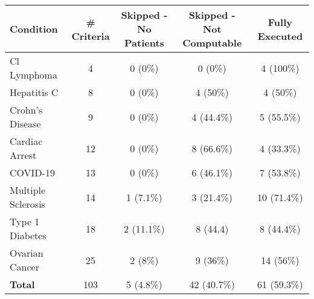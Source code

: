 \def\arraystretch{1.4}
\begin{tabular}{l c c c c}
    \textbf{Condition} & \textbf{\# Criteria} & \textbf{Skipped - \newline No Patients} & \textbf{Skipped - \newline Not Computable} & \textbf{Fully Executed} \\
    \toprule
    Cl Lymphoma        & 4  & 0 (0\%)    & 0 (0\%)    & 4  (100\%)  \\
    Hepatitis C        & 8  & 0 (0\%)    & 4 (50\%)   & 4  (50\%)   \\
    Crohn's Disease    & 9  & 0 (0\%)    & 4 (44.4\%) & 5  (55.5\%) \\
    Cardiac Arrest     & 12 & 0 (0\%)    & 8 (66.6\%) & 4  (33.3\%) \\
    COVID-19           & 13 & 0 (0\%)    & 6 (46.1\%) & 7  (53.8\%) \\
    Multiple Sclerosis & 14 & 1 (7.1\%)  & 3 (21.4\%) & 10 (71.4\%) \\
    Type 1 Diabetes    & 18 & 2 (11.1\%) & 8 (44.4)   & 8  (44.4\%) \\
    Ovarian Cancer     & 25 & 2 (8\%)    & 9 (36\%)   & 14 (56\%)   \\
    \bottomrule
    \textbf{Total} & 103 & 5 (4.8\%) & 42 (40.7\%) & 61 (59.3\%)
\end{tabular}